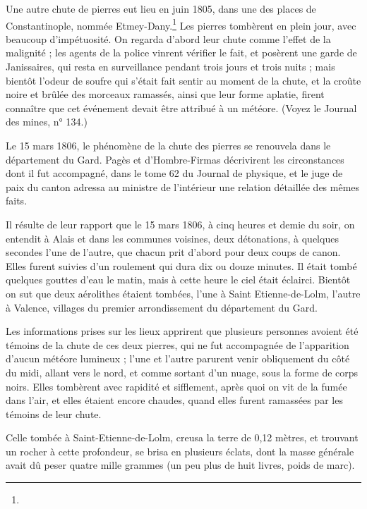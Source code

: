 \documentclass[a4paper, 12pt, oneside, french]{article}
\begin{document}
Une autre chute de pierres eut lieu en juin 1805, dans une des places de Constantinople, nommée Etmey-Dany.\footnote{} Les pierres tombèrent en plein jour, avec beaucoup d'impétuosité. On regarda d'abord leur chute comme l'effet de la malignité ; les agents de la police vinrent vérifier le fait, et posèrent une garde de Janissaires, qui resta en surveillance pendant trois jours et trois nuits ; mais bientôt l'odeur de soufre qui s'était fait sentir au moment de la chute, et la croûte noire et brûlée des morceaux ramassés, ainsi que leur forme aplatie, firent connaître que cet événement devait être attribué à un météore. (Voyez le Journal des mines, n° 134.)

Le 15 mars 1806, le phénomène de la chute des pierres se renouvela dans le département du Gard. Pagès et d'Hombre-Firmas décrivirent les circonstances dont il fut accompagné, dans le tome 62 du Journal de physique, et le juge de paix du canton adressa au ministre de l'intérieur une relation détaillée des mêmes faits.

Il résulte de leur rapport que le 15 mars 1806, à cinq heures et demie du soir, on entendit à Alais et dans les communes voisines, deux détonations, à quelques secondes l'une de l'autre, que chacun prit d'abord pour deux coups de canon. Elles furent suivies d'un roulement qui dura dix ou douze minutes. Il était tombé quelques gouttes d'eau le matin, mais à cette heure le ciel était éclairci. Bientôt on sut que deux aérolithes étaient tombées, l'une à Saint Etienne-de-Lolm, l'autre à Valence, villages du premier arrondissement du département du Gard.

Les informations prises sur les lieux apprirent que plusieurs personnes avoient été témoins de la chute de ces deux pierres, qui ne fut accompagnée de l'apparition d'aucun météore lumineux ; l'une et l'autre parurent venir obliquement du côté du midi, allant vers le nord, et comme sortant d'un nuage, sous la forme de corps noirs. Elles tombèrent avec rapidité et sifflement, après quoi on vit de la fumée dans l'air, et elles étaient encore chaudes, quand elles furent ramassées par les témoins de leur chute.

Celle tombée à Saint-Etienne-de-Lolm, creusa la terre de 0,12 mètres, et trouvant un rocher à cette profondeur, se brisa en plusieurs éclats, dont la masse générale avait dû peser quatre mille grammes (un peu plus de huit livres, poids de marc).
\end{document}
